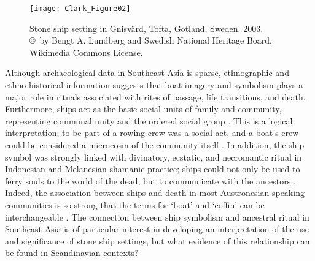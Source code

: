 \begin{wrapfigure}{O}[3cm]{0.5\textwidth}
	\texttt{[image: Clark\_Figure02]}
	\caption{Stone ship setting in Gnisvärd, Tofta, Gotland, Sweden. 2003.
		{\normalfont\scriptsize \\ \copyright\ by Bengt A. Lundberg and Swedish National Heritage Board, Wikimedia Commons License.
	}}
	\label{fig:Clark_Figure02}
\end{wrapfigure}
Although archaeological data in Southeast Asia is sparse, ethnographic and ethno-historical information suggests that boat imagery and symbolism plays a major role in rituals associated with rites of passage, life transitions, and death. Furthermore, ships act as the basic social units of family and community, representing communal unity and the ordered social group \parencite[392]{Ballard_2004}.
This is a logical interpretation; to be part of a rowing crew was a social act, and a boat’s crew could be considered a microcosm of the community itself \parencite[46]{Westerdahl_2015}.
In addition, the ship symbol was strongly linked with divinatory, ecstatic, and necromantic ritual in Indonesian and Melanesian shamanic practice; ships could not only be used to ferry souls to the world of the dead, but to communicate with the ancestors \parencite[392]{Ballard_2004}.
Indeed, the association between ships and death in most Austronesian-speaking communities is so strong that the terms for ‘boat’ and ‘coffin’ can be interchangeable \parencites[392]{Ballard_2004}[196]{Manguin_1986}. The connection between ship symbolism and ancestral ritual in Southeast Asia is of particular interest in developing an interpretation of the use and significance of stone ship settings, but what evidence of this relationship can be found in Scandinavian contexts?

